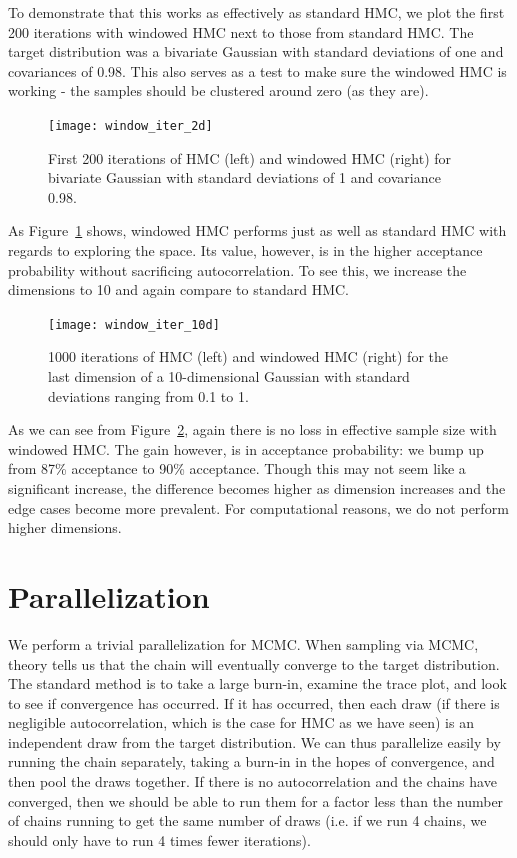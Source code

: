 \documentclass{article}
\numberwithin{equation}{section}
\begin{document}
To demonstrate that this works as effectively as standard HMC, we plot the first 200 iterations with windowed HMC next to those from standard HMC. The target distribution was a bivariate Gaussian with standard deviations of one and covariances of 0.98. This also serves as a test to make sure the windowed HMC is working - the samples should be clustered around zero (as they are).

\begin{figure}[H]
\centering
  \texttt{[image: window\_iter\_2d]}
  \caption{First 200 iterations of HMC (left) and windowed HMC (right) for bivariate Gaussian with standard deviations of 1 and covariance 0.98.}
\label{window_2d}
\end{figure}

As Figure~\ref{window_2d} shows, windowed HMC performs just as well as standard HMC with regards to exploring the space. Its value, however, is in the higher acceptance probability without sacrificing autocorrelation. To see this, we increase the dimensions to 10 and again compare to standard HMC.

\begin{figure}[H]
\centering
  \texttt{[image: window\_iter\_10d]}
  \caption{1000 iterations of HMC (left) and windowed HMC (right) for the last dimension of a 10-dimensional Gaussian with standard deviations ranging from 0.1 to 1.}
\label{window_10d}
\end{figure}

As we can see from Figure~\ref{window_10d}, again there is no loss in effective sample size with windowed HMC. The gain however, is in acceptance probability: we bump up from 87\% acceptance to 90\% acceptance. Though this may not seem like a significant increase, the difference becomes higher as dimension increases and the edge cases become more prevalent. For computational reasons, we do not perform higher dimensions.

\section{Parallelization}
We perform a trivial parallelization for MCMC. When sampling via MCMC, theory tells us that the chain will eventually converge to the target distribution. The standard method is to take a large burn-in, examine the trace plot, and look to see if convergence has occurred. If it has occurred, then each draw (if there is negligible autocorrelation, which is the case for HMC as we have seen) is an independent draw from the target distribution.  We can thus parallelize easily by running the chain separately, taking a burn-in in the hopes of convergence, and then pool the draws together. If there is no autocorrelation and the chains have converged, then we should be able to run them for a factor less than the number of chains running to get the same number of draws (i.e. if we run 4 chains, we should only have to run 4 times fewer iterations).\\
\end{document}
